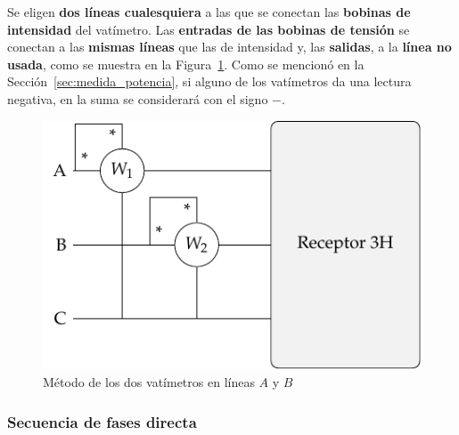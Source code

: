 	Se eligen \textbf{dos líneas cualesquiera} a las que se conectan las \textbf{bobinas de intensidad} del vatímetro. Las \textbf{entradas de las bobinas de tensión} se conectan a las \textbf{mismas líneas} que las de intensidad y, las \textbf{salidas}, a la \textbf{línea no usada}, como se muestra en la Figura~\ref{fig:potencia3H}. Como se mencionó en la Sección~\ref{sec:medida_potencia}, si alguno de los vatímetros da una lectura negativa, en la suma se considerará con el signo $-$.   
	\begin{figure}[H]
	    \centering
	    \includegraphics{../figs/Potencia3H.pdf}
	    \caption{Método de los dos vatímetros en líneas $A$ y $B$}
	    \label{fig:potencia3H}
	\end{figure}
	
	\subsubsection{Secuencia de fases directa}
	
